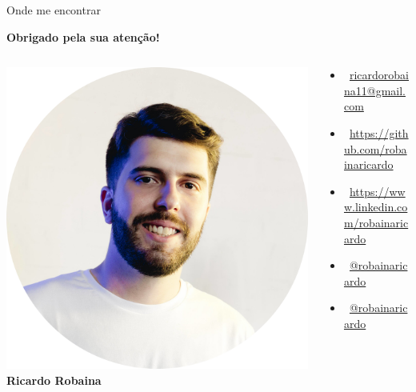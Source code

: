 \documentclass[aspectratio=1610, 12pt]{beamer}
\begin{document}
\begin{frame}{Onde me encontrar}
	
	\centering
		
	\Huge{\textbf{Obrigado pela sua atenção!}}
		
	\vskip1.5cm
		
	\normalsize
	\begin{columns}
			
	\begin{column}{0.25\textwidth}
			\centering
			\includegraphics[scale = 0.1]{fig/fig_eu} \\
			\textbf{Ricardo Robaina} \\
		\end{column}
			
		\begin{column}{0.75\textwidth}  %
			\begin{itemize}  
				\item \faEnvelope\ \url{ricardorobaina11@gmail.com}
				\item \faGithub\ \url{https://github.com/robainaricardo}
				\item \faLinkedin\ \href{https://www.linkedin.com/in/robainaricardo/}{https://www.linkedin.com/robainaricardo}
				\item \faInstagram\ \href{https://www.instagram.com/robainaricardo/?hl=pt-br}{@robainaricardo}
				\item \faTwitter\ \href{https://twitter.com/robainaricardo}{@robainaricardo}
			
				
			\end{itemize}
		\end{column}
	\end{columns}
	
\end{frame}
\end{document}
